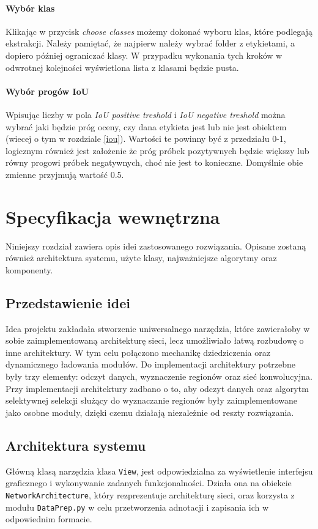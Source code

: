 \documentclass[a4paper,twoside,12pt]{book}
\begin{document}
{\subsubsection{Wybór klas}
{Klikając w przycisk \emph{choose classes} możemy dokonać wyboru klas, które podlegają ekstrakcji. Należy pamiętać, że najpierw należy wybrać folder z etykietami, a dopiero później ograniczać klasy. W przypadku wykonania tych kroków w odwrotnej kolejności wyświetlona lista z klasami będzie pusta.}
\subsubsection{Wybór progów IoU}
{Wpisując liczby w pola \emph{IoU positive treshold} i \emph{IoU negative treshold} można wybrać jaki będzie próg oceny, czy dana etykieta jest lub nie jest obiektem (wiecej o tym w rozdziale \ref{iou}). Wartości te powinny być z przedziału 0-1, logicznym również jest założenie że próg próbek pozytywnych będzie większy lub równy progowi próbek negatywnych, choć nie jest to konieczne. Domyślnie obie zmienne przyjmują wartość 0.5.}


 

\chapter{Specyfikacja wewnętrzna}
{Niniejszy rozdział zawiera opis idei zastosowanego rozwiązania. Opisane zostaną również architektura systemu, użyte klasy, najważniejsze algorytmy oraz komponenty.}
\section{Przedstawienie idei}
{Idea projektu zakładała stworzenie uniwersalnego narzędzia, które zawierałoby w sobie zaimplementowaną architekturę sieci, lecz umożliwiało łatwą rozbudowę o inne architektury. W tym celu połączono mechanikę dziedziczenia oraz dynamicznego ładowania modułów. Do implementacji architektury potrzebne były trzy elementy: odczyt danych, wyznaczenie regionów oraz sieć konwolucyjna. Przy implementacji architektury zadbano o to, aby odczyt danych oraz algorytm selektywnej selekcji służący do wyznaczanie regionów były zaimplementowane jako osobne moduły, dzięki czemu działają niezależnie od reszty rozwiązania.}
\section{Architektura systemu}
{Główną klasą narzędzia klasa \lstinline|View|,  jest odpowiedzialna za wyświetlenie interfejsu graficznego i wykonywanie zadanych funkcjonalności. Działa ona na obiekcie \lstinline|NetworkArchitecture|, który rezprezentuje architekturę sieci, oraz korzysta z modułu \lstinline|DataPrep.py| w celu przetworzenia adnotacji i zapisania ich w odpowiednim formacie.}
}
\end{document}
